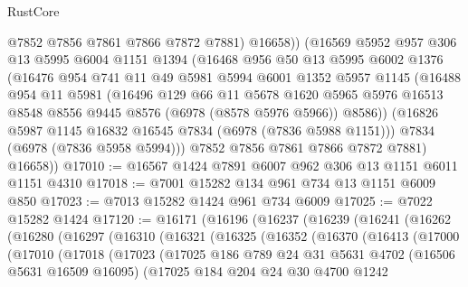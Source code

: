 \begin{lexlean}{RustCore}
\begin{coremodule}
            @7852
            @7856
            @7861
            @7866
            @7872
            @7881)
          @16658))
      (@16569
        @5952
        @957
        @306
        @13
        @5995
        @6004
        @1151
        @1394
        (@16468
          @956
          @50
          @13
          @5995
          @6002
          @1376
          (@16476
            @954
            @741
            @11
            @49
            @5981
            @5994
            @6001
            @1352
            @5957
            @1145
            (@16488
              @954
              @11
              @5981
              (@16496
                @129
                @66
                @11
                @5678
                @1620
                @5965
                @5976
                @16513
                @8548
                @8556
                @9445
                @8576
                (@6978 (@8578 @5976 @5966))
                @8586))
            (@16826 @5987 @1145 @16832 @16545 @7834 (@6978 (@7836 @5988 @1151)))
            @7834
            (@6978 (@7836 @5958 @5994)))
          @7852
          @7856
          @7861
          @7866
          @7872
          @7881)
        @16658))
@17010 := @16567 @1424 @7891 @6007 @962 @306 @13 @1151 @6011 @1151 @4310
@17018 := @7001 @15282 @134 @961 @734 @13 @1151 @6009 @850
@17023 := @7013 @15282 @1424 @961 @734 @6009
@17025 := @7022 @15282 @1424
@17120 := @16171
    (@16196
      (@16237
        (@16239
          (@16241
            (@16262
              (@16280
                (@16297
                  (@16310
                    (@16321
                      (@16325
                        (@16352
                          (@16370
                            (@16413
                              (@17000
                                (@17010
                                  (@17018
                                    (@17023
                                      (@17025
                                        @186
                                        @789
                                        @24
                                        @31
                                        @5631
                                        @4702
                                        (@16506 @5631 @16509 @16095)
                                        (@17025
                                          @184
                                          @204
                                          @24
                                          @30
                                          @4700
                                          @1242

\end{coremodule}
\end{lexlean}
